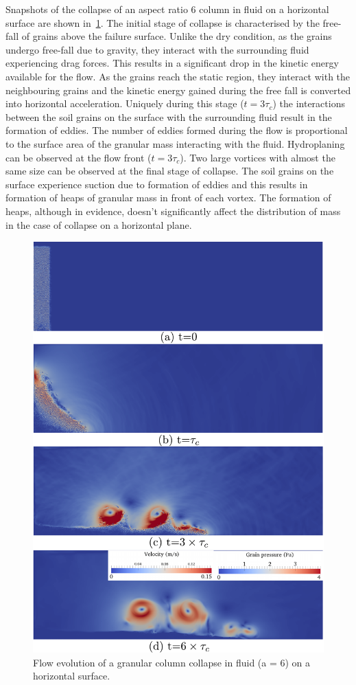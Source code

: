 \documentclass[epj,twocolumn]{webofc}
\begin{document}
Snapshots of the collapse of an aspect ratio 6 column in fluid on a horizontal 
surface are shown in~\cref{fig:LBM_DEM_a6}. The initial stage of collapse is 
characterised by the free-fall of grains above the failure surface. Unlike the 
dry condition, as the grains undergo free-fall due to gravity, they interact 
with the surrounding fluid experiencing drag forces. This results in a 
significant drop in the kinetic energy available for the flow. As the grains 
reach the static region, they interact with the neighbouring grains and the 
kinetic energy gained during the free fall is converted into horizontal 
acceleration. Uniquely during this stage ($t = 3\tau_c$) the interactions 
between the soil grains on the surface with the surrounding fluid result in the 
formation of eddies. The number of eddies formed during the flow is 
proportional to the surface area of the granular mass interacting with the 
fluid. Hydroplaning can be observed at the flow front ($t = 3\tau_c$). Two 
large vortices with almost the same size can be observed at the final stage of 
collapse. The soil grains on the surface experience suction due to formation of 
eddies and this results in formation of heaps of granular mass in front of each 
vortex. The formation of heaps, although in evidence, doesn't significantly 
affect the distribution of mass in the case of collapse on a horizontal plane. 

\begin{figure}[htpb]
\centering
\includegraphics[width=0.9\linewidth]{figs/lbm_dem_a6}
\caption{Flow evolution of a granular column collapse in fluid (a = 6) on a 
horizontal surface.}
\label{fig:LBM_DEM_a6}
\end{figure}
\end{document}
